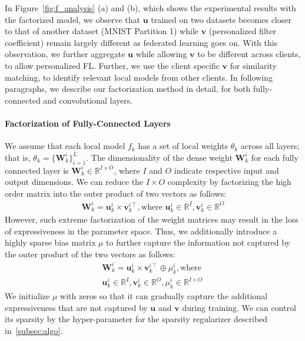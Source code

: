In Figure~\ref{fig:f_analysis} (a) and (b), which shows the experimental results with the factorized model, we observe that $\textbf{u}$ trained on two datasets becomes closer to that of another dataset (MNIST Partition 1) while $\textbf{v}$ (personalized filter coefficient) remain largely different as federated learning goes on. With this observation, we further aggregate $\textbf{u}$ while allowing $\textbf{v}$ to be different across clients, to allow personalized FL. Further, we use the client specific $\textbf{v}$ for similarity matching, to identify relevant local models from other clients. In following paragraphs, we describe our factorization method in detail, for both fully-connected and convolutional layers. \vspace{-0.15in}





\paragraph{Factorization of Fully-Connected Layers} We assume that each local model $f_k$ has a set of local weights $\theta_k$ across all layers; that is, $\theta_k=\{\textbf{W}^{i}_k\}^{L}_{i=1}$. The dimensionality of the dense weight $\textbf{W}_k^{i}$ for each fully connected layer is $\textbf{W}_k^{i} \in \mathbb{R}^{I \times O}$, where $I$ and $O$ indicate respective input and output dimensions. We can reduce the $I \times O$ complexity by factorizing the high order matrix into the outer product of two vectors as follows:
\begin{equation}
\begin{split}
\textbf{W}_k^{i} = \textbf{u}_k^{i} \times \textbf{v}_k^{i \intercal}, \text{where } \textbf{u}_k^{i} \in \mathbb{R}^{I}, \textbf{v}_k^{i} \in \mathbb{R}^{O}
\end{split}
\end{equation}
 However, such extreme factorization of the weight matrices may result in the loss of expressiveness in the parameter space. Thus, we additionally introduce a highly sparse bias matrix $\mu$ to further capture the information not captured by the outer product of the two vectors as follows:
\begin{equation}
\begin{split}
\textbf{W}_k^{i} = \textbf{u}_k^{i} \times \textbf{v}_k^{i \intercal} \oplus {\mu}_k^{i}, 
\text{where } \\ \textbf{u}_k^{i} \in \mathbb{R}^{I},  
\textbf{v}_k^{i} \in \mathbb{R}^{O}, {\mu}_k^{i} \in \mathbb{R}^{I \times O} 
\end{split}
\end{equation}
We initialize $\mu$ with zeros so that it can gradually capture the additional expressiveness that are not captured by $\textbf{u}$ and $\textbf{v}$ during training. We can control its sparsity by the hyper-parameter for the sparsity regularizer described in~\ref{subsec:algo}.

